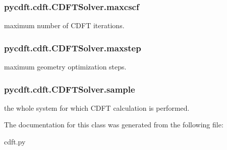 \hypertarget{classpycdft_1_1cdft_1_1CDFTSolver_a4bd78f134669a46d676a557d811949e5}{
\subsubsection[{maxcscf}]{\setlength{\rightskip}{0pt plus 5cm}pycdft.\-cdft.\-C\-D\-F\-T\-Solver.\-maxcscf}}\label{classpycdft_1_1cdft_1_1CDFTSolver_a4bd78f134669a46d676a557d811949e5}


maximum number of C\-D\-F\-T iterations. 

\hypertarget{classpycdft_1_1cdft_1_1CDFTSolver_a5faef6c90a36457f9dc4dc7525f8f76a}{
\subsubsection[{maxstep}]{\setlength{\rightskip}{0pt plus 5cm}pycdft.\-cdft.\-C\-D\-F\-T\-Solver.\-maxstep}}\label{classpycdft_1_1cdft_1_1CDFTSolver_a5faef6c90a36457f9dc4dc7525f8f76a}


maximum geometry optimization steps. 

\hypertarget{classpycdft_1_1cdft_1_1CDFTSolver_a05ea589d1ad333ed95cef64d86408773}{
\subsubsection[{sample}]{\setlength{\rightskip}{0pt plus 5cm}pycdft.\-cdft.\-C\-D\-F\-T\-Solver.\-sample}}\label{classpycdft_1_1cdft_1_1CDFTSolver_a05ea589d1ad333ed95cef64d86408773}


the whole system for which C\-D\-F\-T calculation is performed. 



The documentation for this class was generated from the following file\-:\begin{DoxyCompactItemize}
\item 
cdft.\-py\end{DoxyCompactItemize}
